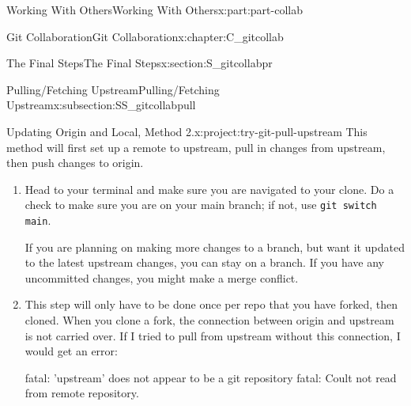 \documentclass[oneside,10pt,]{book}
\newcommand{\mono}[1]{\texttt{#1}}
\begin{document}
\begin{partptx}{Working With Others}{}{Working With Others}{}{}{x:part:part-collab}
\begin{chapterptx}{Git Collaboration}{}{Git Collaboration}{}{}{x:chapter:C_gitcollab}
\begin{sectionptx}{The Final Steps}{}{The Final Steps}{}{}{x:section:S_gitcollabpr}
\begin{subsectionptx}{Pulling\slash{}Fetching Upstream}{}{Pulling\slash{}Fetching Upstream}{}{}{x:subsection:SS_gitcollabpull}
\begin{project}{Updating Origin and Local, Method 2.}{x:project:try-git-pull-upstream}
%
%
%
%
%
%
%
%
This method will first set up a remote to upstream, pull in changes from upstream, then push changes to origin.%
\begin{enumerate}[font=\bfseries,label=(\alph*),ref=\alph*]
\item{}Head to your terminal and make sure you are navigated to your clone. Do a check to make sure you are on your main branch; if not, use \mono{git switch main}.%
\par
If you are planning on making more changes to a branch, but want it updated to the latest upstream changes, you can stay on a branch. If you have any uncommitted changes, you might make a merge conflict.%
\item{}This step will only have to be done once per repo that you have forked, then cloned. When you clone a fork, the connection between origin and upstream is not carried over. If I tried to pull from upstream without this connection, I would get an error: \begin{console}{0}{1}{0}
fatal: 'upstream' does not appear to be a git repository
fatal: Coult not read from remote repository.


\end{console}
\end{enumerate}
\end{project}
\end{subsectionptx}
\end{sectionptx}
\end{chapterptx}
\end{partptx}
\end{document}
